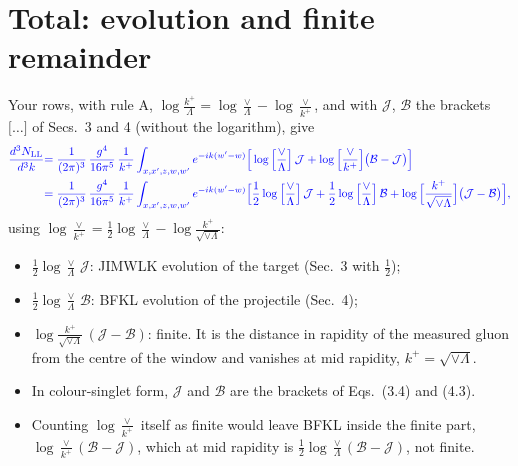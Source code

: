 \documentclass[9pt]{article}
\numberwithin{equation}{section}
\newcommand{\new}[1]{{\color{blue}#1}}
\begin{document}
\section{\new{Total: evolution and finite remainder}}
\new{Your rows, with rule A, $\log\frac{k^+}{\Lambda}=\log\frac{\vee}{\Lambda}-\log\frac{\vee}{k^+}$, and with $\mathcal J$, $\mathcal B$ the brackets $\Big[\dots\Big]$ of Secs.~3 and 4 (without the logarithm), give}
\begin{align}
{\color{blue}\frac{d^{3}N_{\rm LL}}{d^{3}k}}&{\color{blue}=\frac{1}{(2\pi)^{3}}\,\frac{g^{4}}{16\pi^{5}}\,\frac{1}{k^{+}}\int_{x,x',z,w,w'}e^{-ik(w'-w)}\Big[\log\Big[\frac{\vee}{\Lambda}\Big]\,\mathcal J+\log\Big[\frac{\vee}{k^{+}}\Big]\big(\mathcal B-\mathcal J\big)\Big]}\notag\\
&{\color{blue}=\frac{1}{(2\pi)^{3}}\,\frac{g^{4}}{16\pi^{5}}\,\frac{1}{k^{+}}\int_{x,x',z,w,w'}e^{-ik(w'-w)}\Big[\frac{1}{2}\log\Big[\frac{\vee}{\Lambda}\Big]\,\mathcal J+\frac{1}{2}\log\Big[\frac{\vee}{\Lambda}\Big]\,\mathcal B+\log\Big[\frac{k^{+}}{\sqrt{\vee\Lambda}}\Big]\big(\mathcal J-\mathcal B\big)\Big],}
\end{align}
\new{using $\log\frac{\vee}{k^+}=\frac12\log\frac{\vee}{\Lambda}-\log\frac{k^+}{\sqrt{\vee\Lambda}}$:}
\begin{itemize}
\item \new{$\frac12\log\frac{\vee}{\Lambda}\,\mathcal J$: JIMWLK evolution of the target (Sec.~3 with $\frac12$);}
\item \new{$\frac12\log\frac{\vee}{\Lambda}\,\mathcal B$: BFKL evolution of the projectile (Sec.~4);}
\item \new{$\log\frac{k^+}{\sqrt{\vee\Lambda}}\,(\mathcal J-\mathcal B)$: finite. It is the distance in rapidity of the measured gluon from the centre of the window and vanishes at mid rapidity, $k^+=\sqrt{\vee\Lambda}$.}
\item \new{In colour-singlet form, $\mathcal J$ and $\mathcal B$ are the brackets of Eqs.~(3.4) and (4.3).}
\item \new{Counting $\log\frac{\vee}{k^+}$ itself as finite would leave BFKL inside the finite part, $\log\frac{\vee}{k^+}(\mathcal B-\mathcal J)$, which at mid rapidity is $\frac12\log\frac{\vee}{\Lambda}(\mathcal B-\mathcal J)$, not finite.}
\end{itemize}
\end{document}
